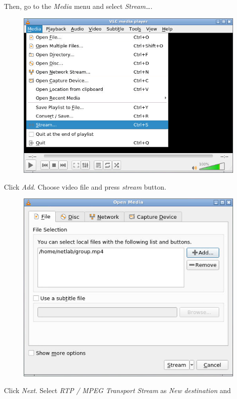 \documentclass{../UTNetLab}
\begin{document}
    Then, go to the \textit{Media} menu and select \textit{Stream\ldots}.
    \begin{figure}[H]
        \centering
        \includegraphics[scale=1.8]{img/open-stream}
    \end{figure}
    Click \textit{Add}. Choose video file  and press \textit{stream} button.
    \begin{figure}[H]
        \centering
        \includegraphics[scale=1.8]{img/stream}
    \end{figure}
    Click \textit{Next}.
    Select \textit{RTP / MPEG Transport Stream} as \textit{New destination} and
\end{document}

